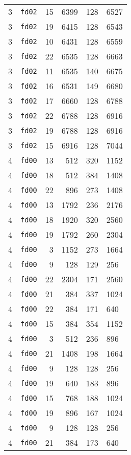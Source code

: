 \documentclass{article}
\begin{document}
\begin{table}[h!]
\begin{tabular}{llrrrl}
    3 & \texttt{fd02} & 15 & 6399 & 128 & 6527 \\
    3 & \texttt{fd02} & 19 & 6415 & 128 & 6543 \\
    3 & \texttt{fd02} & 10 & 6431 & 128 & 6559 \\
    3 & \texttt{fd02} & 22 & 6535 & 128 & 6663 \\
    3 & \texttt{fd02} & 11 & 6535 & 140 & 6675 \\
    3 & \texttt{fd02} & 16 & 6531 & 149 & 6680 \\
    3 & \texttt{fd02} & 17 & 6660 & 128 & 6788 \\
    3 & \texttt{fd02} & 22 & 6788 & 128 & 6916 \\
    3 & \texttt{fd02} & 19 & 6788 & 128 & 6916 \\
    3 & \texttt{fd02} & 15 & 6916 & 128 & 7044 \\
    4 & \texttt{fd00} & 13 & 512 & 320 & 1152 \\
    4 & \texttt{fd00} & 18 & 512 & 384 & 1408 \\
    4 & \texttt{fd00} & 22 & 896 & 273 & 1408 \\
    4 & \texttt{fd00} & 13 & 1792 & 236 & 2176 \\
    4 & \texttt{fd00} & 18 & 1920 & 320 & 2560 \\
    4 & \texttt{fd00} & 19 & 1792 & 260 & 2304 \\
    4 & \texttt{fd00} & 3 & 1152 & 273 & 1664 \\
    4 & \texttt{fd00} & 9 & 128 & 129 & 256 \\
    4 & \texttt{fd00} & 22 & 2304 & 171 & 2560 \\
    4 & \texttt{fd00} & 21 & 384 & 337 & 1024 \\
    4 & \texttt{fd00} & 22 & 384 & 171 & 640 \\
    4 & \texttt{fd00} & 15 & 384 & 354 & 1152 \\
    4 & \texttt{fd00} & 3 & 512 & 236 & 896 \\
    4 & \texttt{fd00} & 21 & 1408 & 198 & 1664 \\
    4 & \texttt{fd00} & 9 & 128 & 128 & 256 \\
    4 & \texttt{fd00} & 19 & 640 & 183 & 896 \\
    4 & \texttt{fd00} & 15 & 768 & 188 & 1024 \\
    4 & \texttt{fd00} & 19 & 896 & 167 & 1024 \\
    4 & \texttt{fd00} & 9 & 128 & 128 & 256 \\
    4 & \texttt{fd00} & 21 & 384 & 173 & 640 \\

\end{tabular}
\end{table}
\end{document}
